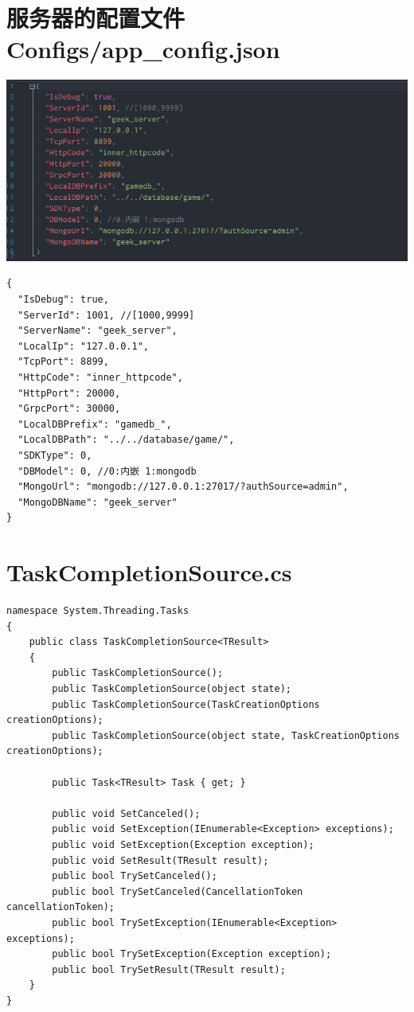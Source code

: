 \documentclass[9pt, b5paper]{article}
\begin{document}
\section{服务器的配置文件 Configs/app\_config.json}
\label{sec-5}

\includegraphics[width=.9\linewidth]{./pic/readme_20230101_180011.png}
\begin{verbatim}
{
  "IsDebug": true,
  "ServerId": 1001, //[1000,9999]
  "ServerName": "geek_server",
  "LocalIp": "127.0.0.1",
  "TcpPort": 8899,
  "HttpCode": "inner_httpcode",
  "HttpPort": 20000,
  "GrpcPort": 30000,
  "LocalDBPrefix": "gamedb_",
  "LocalDBPath": "../../database/game/",
  "SDKType": 0,
  "DBModel": 0, //0:内嵌 1:mongodb
  "MongoUrl": "mongodb://127.0.0.1:27017/?authSource=admin",
  "MongoDBName": "geek_server"
}
\end{verbatim}

\section{TaskCompletionSource.cs}
\label{sec-6}
\begin{verbatim}
namespace System.Threading.Tasks
{
    public class TaskCompletionSource<TResult>
    {
        public TaskCompletionSource();
        public TaskCompletionSource(object state);
        public TaskCompletionSource(TaskCreationOptions creationOptions);
        public TaskCompletionSource(object state, TaskCreationOptions creationOptions);

        public Task<TResult> Task { get; }

        public void SetCanceled();
        public void SetException(IEnumerable<Exception> exceptions);
        public void SetException(Exception exception);
        public void SetResult(TResult result);
        public bool TrySetCanceled();
        public bool TrySetCanceled(CancellationToken cancellationToken);
        public bool TrySetException(IEnumerable<Exception> exceptions);
        public bool TrySetException(Exception exception);
        public bool TrySetResult(TResult result);
    }
}
\end{verbatim}
\end{document}
